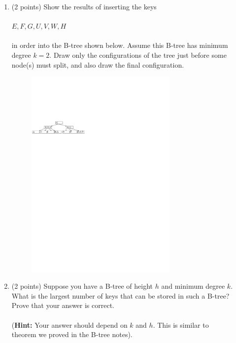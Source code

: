 \documentclass[12pt]{elsart}
\begin{document}
\begin{enumerate}
   \item (2 points) Show the results of inserting the keys\\\\
$E,F,G,U,V,W,H$\\\\
in order into the B-tree shown below.  Assume this B-tree has minimum degree $k=2$. Draw only the configurations
of the tree just before some node(s) must split, and also draw the final configuration.

\vspace{-1.5mm}
\begin{figure}[h]
	\centering \includegraphics[width=0.7\textwidth]{BTreeProblem-01}
\end{figure}
\vspace{-1.5mm}

   \item (2 points) Suppose you have a B-tree of height $h$ and minimum degree $k$. What is the largest number of keys that can be stored in such a B-tree?  Prove that your answer is correct.
\\\\({\bf Hint:} Your answer should depend on $k$ and $h$. This is similar to \\theorem we proved in the B-tree notes).
\end{enumerate}
\end{document}
